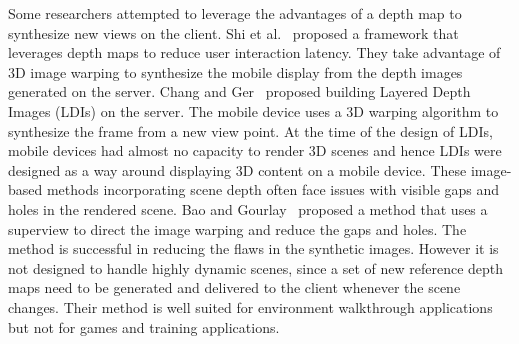 Some researchers attempted to leverage the advantages of a depth map to synthesize new views on the client. 
Shi et al.~\cite{shi2012} proposed a framework that leverages depth maps to reduce user interaction latency. They take advantage of 3D image warping to synthesize the mobile display from the depth images generated on the server.
Chang and Ger~\cite{chang2002} proposed building Layered Depth Images (LDIs) on the server. The mobile device uses a 3D warping algorithm to synthesize the frame from a new view point.
At the time of the design of LDIs, mobile devices had almost no capacity to render 3D scenes and hence LDIs were designed as a way around displaying 3D content on a mobile device. 
These image-based methods incorporating scene depth often face issues with visible gaps and holes in the rendered scene. Bao and Gourlay~\cite{bao2006-1,bao2006-2} proposed a method that uses a superview to direct the image warping and reduce the gaps and holes.
The method is successful in reducing the flaws in the synthetic images. However it is not designed to handle highly dynamic scenes, since a set of new reference depth maps need to be generated and delivered to the client whenever the scene changes. Their method is well suited for environment walkthrough applications but not for games and training applications.

